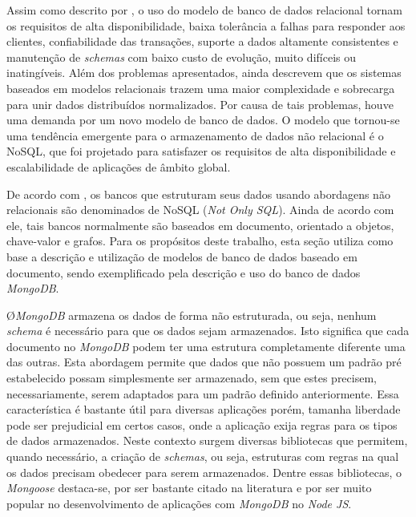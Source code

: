 
Assim como descrito por , o uso do modelo de banco de dados relacional tornam os requisitos de alta disponibilidade, baixa tolerância a falhas para responder aos clientes, confiabilidade das transações, suporte a dados altamente consistentes e manutenção de \textit{schemas} com baixo custo de evolução, muito difíceis ou inatingíveis. Além dos problemas apresentados,  ainda descrevem que os sistemas baseados em modelos relacionais trazem uma maior complexidade e sobrecarga para unir dados distribuídos normalizados. Por causa de tais problemas, houve uma demanda por um novo modelo de banco de dados. O modelo que tornou-se uma tendência emergente para o armazenamento de dados não relacional é o NoSQL, que foi projetado para satisfazer os requisitos de alta disponibilidade e escalabilidade de aplicações de âmbito global.
    
De acordo com , os bancos que estruturam seus dados usando abordagens não relacionais são denominados de NoSQL (\textit{Not Only SQL}). Ainda de acordo com ele, tais bancos normalmente são baseados em documento, orientado a objetos, chave-valor e grafos. Para os propósitos deste trabalho, esta seção utiliza como base a descrição e utilização de modelos de banco de dados baseado em documento, sendo exemplificado pela descrição e uso do banco de dados \textit{MongoDB}.

\O \textit{MongoDB} armazena os dados de forma não estruturada, ou seja, nenhum \textit{schema} é necessário para que os dados sejam armazenados. Isto significa que cada documento no \textit{MongoDB} podem ter uma estrutura completamente diferente uma das outras. Esta abordagem permite que dados que não possuem um padrão pré estabelecido possam simplesmente ser armazenado, sem que estes precisem, necessariamente, serem adaptados para um padrão definido anteriormente. Essa característica é bastante útil para diversas aplicações porém, tamanha liberdade pode ser prejudicial em certos casos, onde a aplicação exija regras para os tipos de dados armazenados. Neste contexto surgem diversas bibliotecas que permitem, quando necessário, a criação de \textit{schemas}, ou seja, estruturas com regras na qual os dados precisam obedecer para serem armazenados. Dentre essas bibliotecas, o \textit{Mongoose} destaca-se, por ser bastante citado na literatura e por ser muito popular no desenvolvimento de aplicações com \textit{MongoDB} no \textit{Node JS}.

